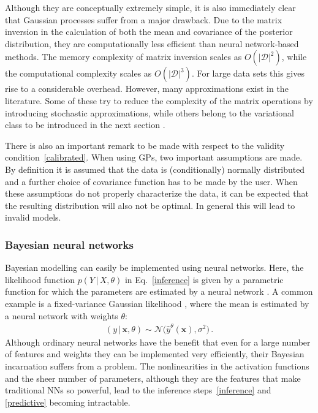 \documentclass[smallcondensed]{svjour3}
\begin{document}
    Although they are conceptually extremely simple, it is also immediately clear that Gaussian processes suffer from a major drawback. Due to the matrix inversion in the calculation of both the mean and covariance of the posterior distribution, they are computationally less efficient than neural network-based methods. The memory complexity of matrix inversion scales as $O\left(|\mathcal{D}|^2\right)$, while the computational complexity scales as $O\left(|\mathcal{D}|^3\right)$. For large data sets this gives rise to a considerable overhead. However, many approximations exist in the literature. Some of these try to reduce the complexity of the matrix operations by introducing stochastic approximations, while others belong to the variational class to be introduced in the next section \cite{hensman2015scalable,wilson2015kernel}.

    There is also an important remark to be made with respect to the validity condition~\eqref{calibrated}. When using GPs, two important assumptions are made. By definition it is assumed that the data is (conditionally) normally distributed and a further choice of covariance function has to be made by the user. When these assumptions do not properly characterize the data, it can be expected that the resulting distribution will also not be optimal. In general this will lead to invalid models.

\subsubsection*{Bayesian neural networks}

    Bayesian modelling can easily be implemented using neural networks. Here, the likelihood function $p(Y\,|\,X,\theta)$ in Eq.~\eqref{inference} is given by a parametric function for which the parameters are estimated by a neural network \cite{goan2020bayesian,mackay1992practical,neal}. A common example is a fixed-variance Gaussian likelihood \cite{hinton1993keeping}, where the mean is estimated by a neural network with weights $\theta$:
    \begin{gather}
        (y\,|\,\mathbf{x},\theta) \sim \mathcal{N}\big(\hat{y}^\theta(\mathbf{x}),\sigma^2\big)\,.
    \end{gather}
    Although ordinary neural networks have the benefit that even for a large number of features and weights they can be implemented very efficiently, their Bayesian incarnation suffers from a problem. The nonlinearities in the activation functions and the sheer number of parameters, although they are the features that make traditional NNs so powerful, lead to the inference steps~\eqref{inference} and \eqref{predictive} becoming intractable.
\end{document}
